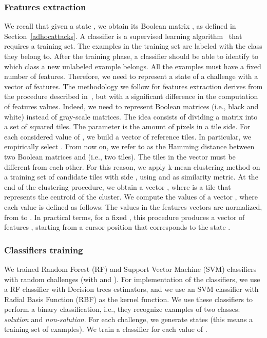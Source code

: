 \documentclass[conference]{IEEEtran}
\begin{document}
\subsubsection{Features extraction}
\label{featuresextraction}
We recall that given a state , we obtain its Boolean matrix , as defined in Section~\ref{adhocattacks}.
A classifier is a supervised learning algorithm~\cite{kotsiantis2007supervised} that requires a training set. The examples in the training set are labeled with the class they belong to. After the training phase, a classifier should be able to identify to which class a new unlabeled example belongs.
All the examples must have a fixed number of features.
Therefore, we need to represent a state of a challenge with a vector of  features.
The methodology we follow for features extraction derives from
the procedure described in~\cite{golle2008machine}, but with a significant difference in the computation of features values. Indeed, we need to represent Boolean matrices (i.e., black and white) instead of gray-scale matrices. The idea consists of dividing a matrix  into a set  of squared tiles. The parameter  is the amount of pixels in a tile side.
For each considered value of , we build a vector  of reference tiles.
In particular, we empirically select . From now on, we refer to  as the Hamming distance between two Boolean matrices  and  (i.e., two tiles).
The tiles in the vector  must be different from each other. 
For this reason, 
we apply k-mean clustering method on a training set of candidate tiles with side , using  and  as similarity metric.
At the end of the clustering procedure, we obtain a vector , where  is a tile that represents the centroid of the  cluster.
We compute the values of a vector , where each value is defined as follows: \newcommand{\argmin}{\operatornamewithlimits{argmin}}
\newcommand{\argmax}{\operatornamewithlimits{argmax}}
 The values in the features vectors  are normalized, from  to . In practical terms, for a fixed , this procedure produces a vector of features , starting from a cursor position  that corresponds to the state . 

\subsubsection{Classifiers training}
\label{classifiertraining}
We trained Random Forest (RF) and Support Vector Machine (SVM) classifiers with  random challenges (with  and ).
For implementation of the classifiers, we use a RF classifier with  Decision trees estimators, and we use an SVM classifier with Radial Basis Function (RBF) as the kernel function.
We use these classifiers to perform a binary classification, i.e., they recognize examples of two classes: \textit{solution} and \textit{non-solution}.
For each challenge, we generate  states (this means a training set of  examples).
We train a classifier for each value of .
\end{document}
